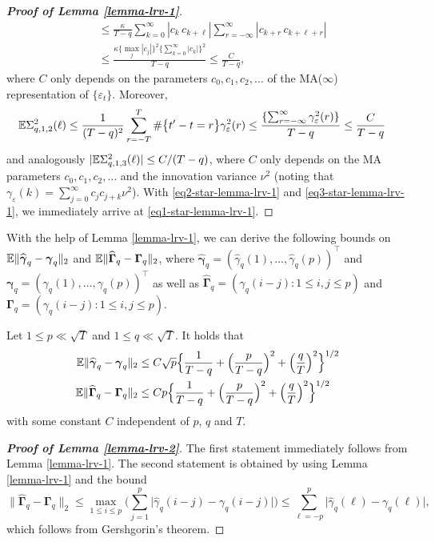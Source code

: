 \begin{proof}[\textnormal{\textbf{Proof of Lemma \ref{lemma-lrv-1}}}]
\begin{align}
 & \le \frac{\kappa}{T-q} \sum_{k=0}^{\infty} | c_k \, c_{k+\ell} | \sum_{r=-\infty}^\infty | c_{k+r} \, c_{k+\ell+r} | \nonumber \\
 & \le \frac{\kappa \{ \max_j|c_j| \}^2 \{ \sum_{k=0}^{\infty} |c_k| \}^2}{T-q}  \le \frac{C}{T-q}, \label{eq2-star-lemma-lrv-1} 
\end{align}
where $C$ only depends on the parameters $c_0,c_1,c_2,\ldots$ of the MA($\infty$) representation of $\{ \varepsilon_t\}$. Moreover, 
\begin{align}
\mathbb{E} \Sigma_{q,1,2}^2(\ell) 
 & \le \frac{1}{(T-q)^2} \sum_{r=-T}^T \# \big\{ t^\prime - t = r \big\} \gamma_{\varepsilon}^2(r) \le \frac{\{ \sum_{r=-\infty}^\infty \gamma_{\varepsilon}^2(r) \}}{T-q} \le \frac{C}{T-q} \label{eq3-star-lemma-lrv-1}
\end{align}
and analogously $|\mathbb{E} \Sigma_{q,1,3}^2(\ell)| \le C/(T-q)$, where $C$ only depends on the MA parameters $c_0,c_1,c_2,\ldots$ and the innovation variance $\nu^2$ (noting that $\gamma_\varepsilon(k) = \sum_{j=0}^\infty c_j c_{j+k} \nu^2$). With \eqref{eq2-star-lemma-lrv-1} and \eqref{eq3-star-lemma-lrv-1}, we immediately arrive at \eqref{eq1-star-lemma-lrv-1}. 
\end{proof}


With the help of Lemma \ref{lemma-lrv-1}, we can derive the following bounds on $\mathbb{E} \| \widehat{\boldsymbol{\gamma}}_q - \boldsymbol{\gamma}_q \|_2$ and $\mathbb{E} \| \widehat{\boldsymbol{\Gamma}}_q - \boldsymbol{\Gamma}_q \|_2$, where $\widehat{\boldsymbol{\gamma}}_q = (\widehat{\gamma}_q(1),\dots,\widehat{\gamma}_q(p))^\top$ and $\boldsymbol{\gamma}_q = (\gamma_q(1),\dots,\gamma_q(p))^\top$ as well as $\widehat{\boldsymbol{\Gamma}}_q = (\widehat{\gamma}_q(i-j): 1 \le i,j \le p)$ and $\boldsymbol{\Gamma}_q = (\gamma_q(i-j): 1 \le i,j \le p)$. 
%
%
\begin{lemmaA}\label{lemma-lrv-2}
Let $1 \le p \ll \sqrt{T}$ and $1 \le q \ll \sqrt{T}$. It holds that 
\begin{align*}
\mathbb{E} \| \widehat{\boldsymbol{\gamma}}_q - \boldsymbol{\gamma}_q \|_2 & \le C \sqrt{p} \Big\{ \frac{1}{T-q} + \Big(\frac{p}{T-q}\Big)^2 + \Big(\frac{q}{T}\Big)^2 \Big\}^{1/2} \\
\mathbb{E} \| \widehat{\boldsymbol{\Gamma}}_q - \boldsymbol{\Gamma}_q \|_2 & \le C p \Big\{ \frac{1}{T-q} + \Big(\frac{p}{T-q}\Big)^2 + \Big(\frac{q}{T}\Big)^2 \Big\}^{1/2}
\end{align*}
with some constant $C$ independent of $p$, $q$ and $T$. 
\end{lemmaA}
%
%
\begin{proof}[\textnormal{\textbf{Proof of Lemma \ref{lemma-lrv-2}}}] 
The first statement immediately follows from Lemma \ref{lemma-lrv-1}. The second statement is obtained by using Lemma \ref{lemma-lrv-1} and the bound
\[ \| \widehat{\boldsymbol{\Gamma}}_q - \boldsymbol{\Gamma}_q \|_2 \le \max_{1 \le i \le p} \Big( \sum\limits_{j=1}^p \big| \widehat{\gamma}_q(i-j) - \gamma_q(i-j) \big| \Big) \le \sum\limits_{\ell=-p}^p \big| \widehat{\gamma}_q(\ell) - \gamma_q(\ell) \big|, \]
which follows from Gershgorin's theorem. 
\end{proof}


